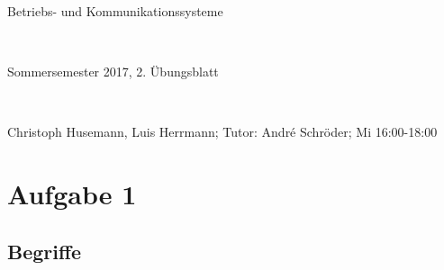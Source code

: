 \documentclass[numbers=noendperiod]{scrartcl}
\begin{document}
	
\newcommand{\inputmintedframed}[2]{
	\begin{mdframed}[linecolor=bg,backgroundcolor=bg]
		\inputminted[mathescape,breaklines,linenos,numbersep=5pt,tabsize=3]{#1}{#2}
	\end{mdframed}}
	
\hrulefill
\begin{center}
	\bfseries %
	\sffamily %
	\begin{huge}
		Betriebs- und Kommunikationssysteme
	\end{huge}\\
	\begin{Large}
		Sommersemester 2017, 2. Übungsblatt
	\end{Large}\\
	\begin{small}
		Christoph Husemann, Luis Herrmann; Tutor: André Schröder; Mi 16:00-18:00
	\end{small}
	
	\vspace{-10pt}
\end{center}
\hrulefill

\section*{Aufgabe 1}
\subsection*{Begriffe}
\end{document}
